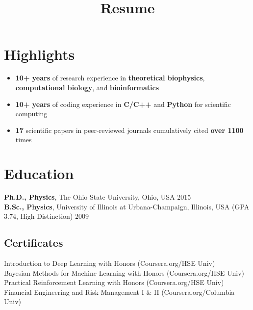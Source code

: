 \documentclass[11pt]{../yhlcv}
\begin{document}
\title{Resume}

\maketitle

\raggedright

\section*{Highlights}

\begin{itemize}[leftmargin=*]\itemsep-0.2em
\item {\bf 10+ years} of research experience in {\bf theoretical biophysics}, {\bf computational biology}, and {\bf bioinformatics}
\item {\bf 10+ years} of coding experience in {\bf C/C++} and {\bf Python} for scientific computing
\item {\bf 17} scientific papers in peer-reviewed journals cumulatively cited {\bf over 1100} times
\end{itemize}

\section*{Education}

{\bf Ph.D., Physics}, The Ohio State University, Ohio, USA \hfill 2015 \\
{\bf B.Sc., Physics}, University of Illinois at Urbana-Champaign, Illinois, USA (GPA 3.74, High Distinction) \hfill 2009

\subsection*{Certificates}
Introduction to Deep Learning with Honors (Coursera.org/HSE Univ) \\
Bayesian Methods for Machine Learning with Honors (Coursera.org/HSE Univ)   \\
Practical Reinforcement Learning with Honors (Coursera.org/HSE Univ)  \\
Financial Engineering and Risk Management I \& II (Coursera.org/Columbia Univ)
\end{document}
